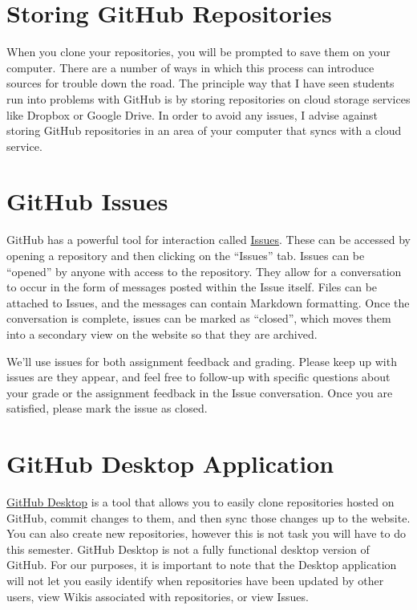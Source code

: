 \documentclass[]{book}
\theoremstyle{definition}
\theoremstyle{definition}
\theoremstyle{remark}
\begin{document}
\section{Storing GitHub Repositories}\label{storing-github-repositories}

When you clone your repositories, you will be prompted to save them on
your computer. There are a number of ways in which this process can
introduce sources for trouble down the road. The principle way that I
have seen students run into problems with GitHub is by storing
repositories on cloud storage services like Dropbox or Google Drive. In
order to avoid any issues, I advise against storing GitHub repositories
in an area of your computer that syncs with a cloud service.

\section{GitHub Issues}\label{github-issues}

GitHub has a powerful tool for interaction called
\href{https://help.github.com/articles/about-issues/}{Issues}. These can
be accessed by opening a repository and then clicking on the ``Issues''
tab. Issues can be ``opened'' by anyone with access to the repository.
They allow for a conversation to occur in the form of messages posted
within the Issue itself. Files can be attached to Issues, and the
messages can contain Markdown formatting. Once the conversation is
complete, issues can be marked as ``closed'', which moves them into a
secondary view on the website so that they are archived.

We'll use issues for both assignment feedback and grading. Please keep
up with issues are they appear, and feel free to follow-up with specific
questions about your grade or the assignment feedback in the Issue
conversation. Once you are satisfied, please mark the issue as closed.

\section{GitHub Desktop Application}\label{github-desktop-application}

\href{https://desktop.github.com}{GitHub Desktop} is a tool that allows
you to easily clone repositories hosted on GitHub, commit changes to
them, and then sync those changes up to the website. You can also create
new repositories, however this is not task you will have to do this
semester. GitHub Desktop is not a fully functional desktop version of
GitHub. For our purposes, it is important to note that the Desktop
application will not let you easily identify when repositories have been
updated by other users, view Wikis associated with repositories, or view
Issues.
\end{document}
